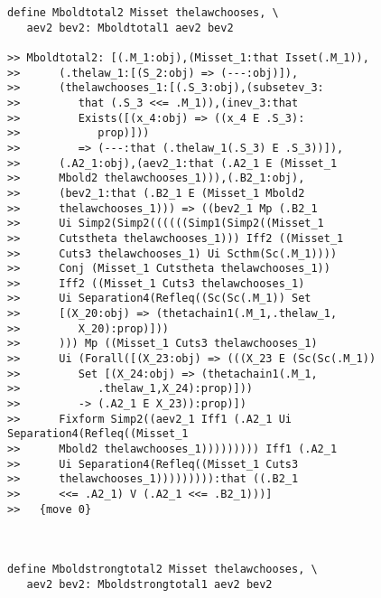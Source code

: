 \documentclass[12pt]{article}
\begin{document}
\begin{verbatim}
define Mboldtotal2 Misset thelawchooses, \
   aev2 bev2: Mboldtotal1 aev2 bev2

>> Mboldtotal2: [(.M_1:obj),(Misset_1:that Isset(.M_1)),
>>      (.thelaw_1:[(S_2:obj) => (---:obj)]),
>>      (thelawchooses_1:[(.S_3:obj),(subsetev_3:
>>         that (.S_3 <<= .M_1)),(inev_3:that
>>         Exists([(x_4:obj) => ((x_4 E .S_3):
>>            prop)]))
>>         => (---:that (.thelaw_1(.S_3) E .S_3))]),
>>      (.A2_1:obj),(aev2_1:that (.A2_1 E (Misset_1
>>      Mbold2 thelawchooses_1))),(.B2_1:obj),
>>      (bev2_1:that (.B2_1 E (Misset_1 Mbold2
>>      thelawchooses_1))) => ((bev2_1 Mp (.B2_1
>>      Ui Simp2(Simp2((((((Simp1(Simp2((Misset_1
>>      Cutstheta thelawchooses_1))) Iff2 ((Misset_1
>>      Cuts3 thelawchooses_1) Ui Scthm(Sc(.M_1))))
>>      Conj (Misset_1 Cutstheta thelawchooses_1))
>>      Iff2 ((Misset_1 Cuts3 thelawchooses_1)
>>      Ui Separation4(Refleq((Sc(Sc(.M_1)) Set
>>      [(X_20:obj) => (thetachain1(.M_1,.thelaw_1,
>>         X_20):prop)]))
>>      ))) Mp ((Misset_1 Cuts3 thelawchooses_1)
>>      Ui (Forall([(X_23:obj) => (((X_23 E (Sc(Sc(.M_1))
>>         Set [(X_24:obj) => (thetachain1(.M_1,
>>            .thelaw_1,X_24):prop)]))
>>         -> (.A2_1 E X_23)):prop)])
>>      Fixform Simp2((aev2_1 Iff1 (.A2_1 Ui Separation4(Refleq((Misset_1
>>      Mbold2 thelawchooses_1))))))))) Iff1 (.A2_1
>>      Ui Separation4(Refleq((Misset_1 Cuts3
>>      thelawchooses_1))))))))):that ((.B2_1
>>      <<= .A2_1) V (.A2_1 <<= .B2_1)))]
>>   {move 0}



define Mboldstrongtotal2 Misset thelawchooses, \
   aev2 bev2: Mboldstrongtotal1 aev2 bev2


\end{verbatim}
\end{document}
